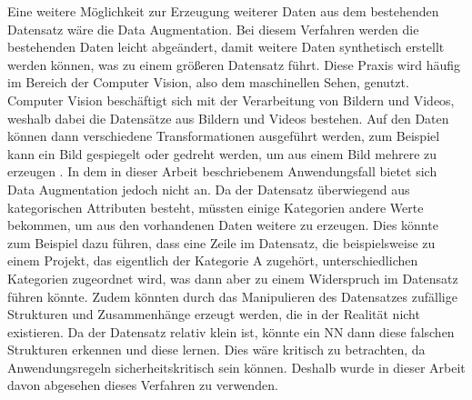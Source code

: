 Eine weitere Möglichkeit zur Erzeugung weiterer Daten aus dem bestehenden Datensatz wäre die Data Augmentation. Bei diesem Verfahren werden die bestehenden Daten 
leicht abgeändert, damit weitere Daten synthetisch erstellt werden können, was zu einem größeren Datensatz führt. Diese Praxis wird häufig im Bereich der Computer Vision,
also dem \glqq maschinellen Sehen\grqq{}, genutzt. Computer Vision beschäftigt sich mit der Verarbeitung von Bildern und Videos, weshalb dabei die Datensätze 
aus Bildern und Videos bestehen. Auf den Daten können dann verschiedene Transformationen ausgeführt werden, zum Beispiel kann ein Bild gespiegelt oder gedreht werden, um aus 
einem Bild mehrere zu erzeugen \cite[vgl. S.184f.]{DL_PY}. In dem in dieser Arbeit beschriebenem Anwendungsfall bietet sich Data Augmentation jedoch nicht an. Da der Datensatz überwiegend
aus kategorischen Attributen besteht, müssten einige Kategorien andere Werte bekommen, um aus den vorhandenen Daten weitere zu erzeugen. Dies könnte zum Beispiel dazu führen,
dass eine Zeile im Datensatz, die beispielsweise zu einem Projekt, das eigentlich der Kategorie \glqq A\grqq{} zugehört, unterschiedlichen Kategorien zugeordnet wird, 
was dann aber zu einem Widerspruch im Datensatz führen könnte. Zudem könnten durch das Manipulieren des Datensatzes zufällige Strukturen und Zusammenhänge erzeugt werden,
die in der Realität nicht existieren. Da der Datensatz relativ klein ist, könnte ein \ac{NN} dann diese falschen Strukturen erkennen und diese lernen. Dies wäre kritisch zu betrachten,
da Anwendungsregeln sicherheitskritisch sein können. Deshalb wurde in dieser Arbeit davon abgesehen dieses Verfahren zu verwenden.

